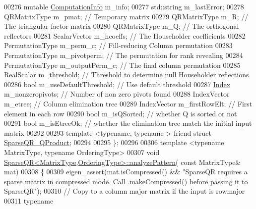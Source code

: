 \begin{DoxyCode}
00276     \textcolor{keyword}{mutable} \hyperlink{group__enums_ga85fad7b87587764e5cf6b513a9e0ee5e}{ComputationInfo} m\_info;
00277     std::string m\_lastError;
00278     QRMatrixType m\_pmat;            \textcolor{comment}{// Temporary matrix}
00279     QRMatrixType m\_R;               \textcolor{comment}{// The triangular factor matrix}
00280     QRMatrixType m\_Q;               \textcolor{comment}{// The orthogonal reflectors}
00281     ScalarVector m\_hcoeffs;         \textcolor{comment}{// The Householder coefficients}
00282     PermutationType m\_perm\_c;       \textcolor{comment}{// Fill-reducing  Column  permutation}
00283     PermutationType m\_pivotperm;    \textcolor{comment}{// The permutation for rank revealing}
00284     PermutationType m\_outputPerm\_c; \textcolor{comment}{// The final column permutation}
00285     RealScalar m\_threshold;         \textcolor{comment}{// Threshold to determine null Householder reflections}
00286     \textcolor{keywordtype}{bool} m\_useDefaultThreshold;     \textcolor{comment}{// Use default threshold}
00287     \hyperlink{namespace_eigen_a62e77e0933482dafde8fe197d9a2cfde}{Index} m\_nonzeropivots;          \textcolor{comment}{// Number of non zero pivots found}
00288     IndexVector m\_etree;            \textcolor{comment}{// Column elimination tree}
00289     IndexVector m\_firstRowElt;      \textcolor{comment}{// First element in each row}
00290     \textcolor{keywordtype}{bool} m\_isQSorted;               \textcolor{comment}{// whether Q is sorted or not}
00291     \textcolor{keywordtype}{bool} m\_isEtreeOk;               \textcolor{comment}{// whether the elimination tree match the initial input matrix}
00292     
00293     \textcolor{keyword}{template} <\textcolor{keyword}{typename}, \textcolor{keyword}{typename} > \textcolor{keyword}{friend} \textcolor{keyword}{struct }\hyperlink{struct_eigen_1_1_sparse_q_r___q_product}{SparseQR\_QProduct};
00294     
00295 \};
00296 
00306 \textcolor{keyword}{template} <\textcolor{keyword}{typename} MatrixType, \textcolor{keyword}{typename} OrderingType>
00307 \textcolor{keywordtype}{void} \hyperlink{group___sparse_q_r___module_a4b425ddb1358c914d764cde48853a4f6}{SparseQR<MatrixType,OrderingType>::analyzePattern}(\textcolor{keyword}{
      const} MatrixType& mat)
00308 \{
00309   eigen\_assert(mat.isCompressed() && \textcolor{stringliteral}{"SparseQR requires a sparse matrix in compressed mode. Call
       .makeCompressed() before passing it to SparseQR"});
00310   \textcolor{comment}{// Copy to a column major matrix if the input is rowmajor}
00311   \textcolor{keyword}{typename} 

\end{DoxyCode}
